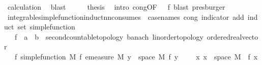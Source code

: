 \begin{isabellebody}
\ calculation\ \isamarkupfalse%
\ blast\isanewline
\ \ \isamarkupfalse%
\ \isamarkupfalse%
\ {\isacharquery}{\kern0pt}thesis\ \isamarkupfalse%
\ {\isacharparenleft}{\kern0pt}intro\ cong{\isacharbrackleft}{\kern0pt}OF\ {\isacharunderscore}{\kern0pt}\ {\isacharunderscore}{\kern0pt}\ f{\isacharparenleft}{\kern0pt}{}{\isacharcomma}{\kern0pt}{}{\isacharparenright}{\kern0pt}{\isacharbrackright}{\kern0pt}{\isacharcomma}{\kern0pt}\ blast{\isacharcomma}{\kern0pt}\ presburger{\isacharplus}{\kern0pt}{\isacharparenright}{\kern0pt}\ \isanewline
{}\isamarkupfalse%
%
\endisatagproof
{\isafoldproof}%
%
\isadelimproof
\isanewline
%
\endisadelimproof
\isanewline
%
\isadelimimportant
\isanewline
%
\endisadelimimportant
%
\isatagimportant
{}\isamarkupfalse%
\ integrable{\isacharunderscore}{\kern0pt}simple{\isacharunderscore}{\kern0pt}function{\isacharunderscore}{\kern0pt}induct{\isacharunderscore}{\kern0pt}nn{\isacharbrackleft}{\kern0pt}consumes\ {}{\isacharcomma}{\kern0pt}\ case{\isacharunderscore}{\kern0pt}names\ cong\ indicator\ add{\isacharcomma}{\kern0pt}\ induct\ set{\isacharcolon}{\kern0pt}\ simple{\isacharunderscore}{\kern0pt}function{\isacharbrackright}{\kern0pt}{\isacharcolon}{\kern0pt}\isanewline
\ \ \ f\ {\isacharcolon}{\kern0pt}{\isacharcolon}{\kern0pt}\ {\isachardoublequoteopen}{\isacharprime}{\kern0pt}a\ {\isasymRightarrow}\ {\isacharprime}{\kern0pt}b\ {\isacharcolon}{\kern0pt}{\isacharcolon}{\kern0pt}\ {\isacharbraceleft}{\kern0pt}second{\isacharunderscore}{\kern0pt}countable{\isacharunderscore}{\kern0pt}topology{\isacharcomma}{\kern0pt}\ banach{\isacharcomma}{\kern0pt}\ linorder{\isacharunderscore}{\kern0pt}topology{\isacharcomma}{\kern0pt}\ ordered{\isacharunderscore}{\kern0pt}real{\isacharunderscore}{\kern0pt}vector{\isacharbraceright}{\kern0pt}{\isachardoublequoteclose}\isanewline
\ \ \ f{\isacharcolon}{\kern0pt}\ {\isachardoublequoteopen}simple{\isacharunderscore}{\kern0pt}function\ M\ f{\isachardoublequoteclose}\ {\isachardoublequoteopen}emeasure\ M\ {\isacharbraceleft}{\kern0pt}y\ {\isasymin}\ space\ M{\isachardot}{\kern0pt}\ f\ y\ {\isasymnoteq}\ {}{\isacharbraceright}{\kern0pt}\ {\isasymnoteq}\ {\isasyminfinity}{\isachardoublequoteclose}\ {\isachardoublequoteopen}{\isasymAnd}x{\isachardot}{\kern0pt}\ x\ {\isasymin}\ space\ M\ {\isasymlongrightarrow}\ f\ x\ {\isasymge}\ {}{\isachardoublequoteclose}\isanewline

\end{isabellebody}
